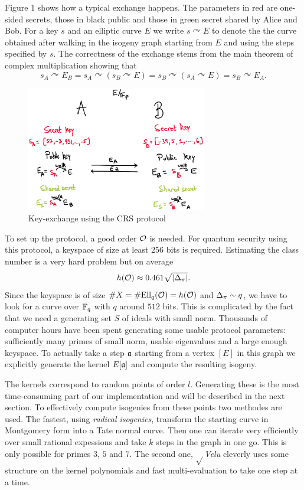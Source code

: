 \documentclass[../main/main.tex]{subfiles}
\begin{document}
Figure 1 shows how a typical exchange happens.
The parameters in red are one-sided secrets, those in black public and those in green secret shared by Alice and Bob.
For a key $s$ and an elliptic curve $E$ we write $s\curvearrowright E$ to denote the the curve obtained after walking in the isogeny graph starting from $E$ and using the steps specified by $s$.
The correctness of the exchange stems from the main theorem of complex multiplication showing that
\[
	s_A\curvearrowright E_B = s_A\curvearrowright(s_B\curvearrowright E) = s_B\curvearrowright(s_A\curvearrowright E) = s_B\curvearrowright E_A.
\]



\begin{figure}[h]
\centering
\includegraphics[width=0.7\textwidth]{dh}
\caption{Key-exchange using the CRS protocol}
\end{figure}

To set up the protocol, a good order $\mathcal{O}$ is needed.
For quantum security using this protocol, a keyspace of size at least $256$ bits is required.
Estimating the class number is a very hard problem but on average
\[
	h(\mathcal{O}) \approx 0.461\sqrt{\left|\Delta_{\pi}\right|}.
\]
Since the keyspace is of size $\# X= \# \text{Ell}_q(\mathcal{O}) = h(\mathcal{O})$ and $\Delta_{\pi}\sim q$, we have to look for a curve over $\mathbb{F}_q$ with $q$ around $512$ bits.
This is complicated by the fact that we need a generating set $S$ of ideals with small norm.
Thousands of computer hours have been spent generating some usable protocol parameters: sufficiently many primes of small norm, usable eigenvalues and a large enough keyspace.
To actually take a step $\mathfrak{a}$ starting from a vertex $[E]$ in this graph we explicitly generate the kernel $E[\mathfrak{a}]$ and compute the resulting isogeny.

The kernels correspond to random points of order $l$.
Generating these is the most time-consuming part of our implementation and will be described in the next section.
To effectively compute isogenies from these points two methodes are used.
The fastest, using \textit{radical isogenies}, transform the starting curve in Montgomery form into a Tate normal curve.
Then one can iterate very efficiently over small rational expessions and take $k$ steps in the graph in one go.
This is only possible for primes $3$, $5$ and $7$.
The second one, $\sqrt{}$\textit{Velu} cleverly uses some structure on the kernel polynomials and fast multi-evaluation to take one step at a time.
\end{document}
